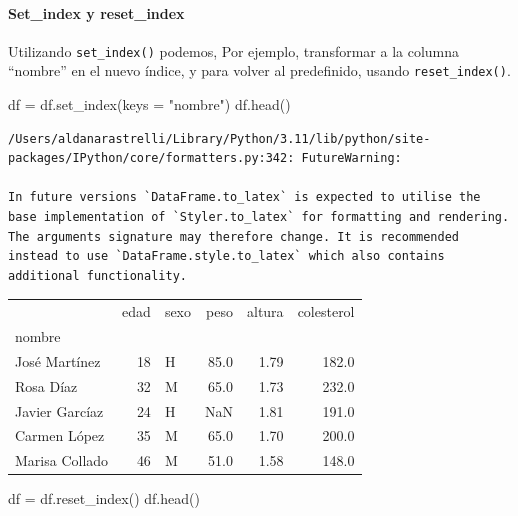\documentclass[
  letterpaper,
  DIV=11,
  numbers=noendperiod]{scrreprt}
\let\oldparagraph\paragraph
\renewcommand{\paragraph}[1]{\oldparagraph{#1}\mbox{}}
\newenvironment{Shaded}{\begin{snugshade}}{\end{snugshade}}
\newcommand{\NormalTok}[1]{\textcolor[rgb]{0.00,0.23,0.31}{#1}}
\newcommand{\OperatorTok}[1]{\textcolor[rgb]{0.37,0.37,0.37}{#1}}
\newcommand{\StringTok}[1]{\textcolor[rgb]{0.13,0.47,0.30}{#1}}
\begin{document}
\paragraph{Set\_index y reset\_index}\label{set_index-y-reset_index}

Utilizando \texttt{set\_index()} podemos, Por ejemplo, transformar a la
columna ``nombre'' en el nuevo índice, y para volver al predefinido,
usando \texttt{reset\_index()}.

\begin{Shaded}
\begin{Highlighting}[]
\NormalTok{df }\OperatorTok{=}\NormalTok{ df.set\_index(keys }\OperatorTok{=} \StringTok{"nombre"}\NormalTok{)}
\NormalTok{df.head()}
\end{Highlighting}
\end{Shaded}

\begin{verbatim}
/Users/aldanarastrelli/Library/Python/3.11/lib/python/site-packages/IPython/core/formatters.py:342: FutureWarning:

In future versions `DataFrame.to_latex` is expected to utilise the base implementation of `Styler.to_latex` for formatting and rendering. The arguments signature may therefore change. It is recommended instead to use `DataFrame.style.to_latex` which also contains additional functionality.
\end{verbatim}

\begin{tabular}{lrlrrr}
\toprule
{} &  edad & sexo &  peso &  altura &  colesterol \\
nombre         &       &      &       &         &             \\
\midrule
José Martínez  &    18 &    H &  85.0 &    1.79 &       182.0 \\
Rosa Díaz      &    32 &    M &  65.0 &    1.73 &       232.0 \\
Javier Garcíaz &    24 &    H &   NaN &    1.81 &       191.0 \\
Carmen López   &    35 &    M &  65.0 &    1.70 &       200.0 \\
Marisa Collado &    46 &    M &  51.0 &    1.58 &       148.0 \\
\bottomrule
\end{tabular}

\begin{Shaded}
\begin{Highlighting}[]
\NormalTok{df }\OperatorTok{=}\NormalTok{ df.reset\_index()}
\NormalTok{df.head()}
\end{Highlighting}
\end{Shaded}
\end{document}
